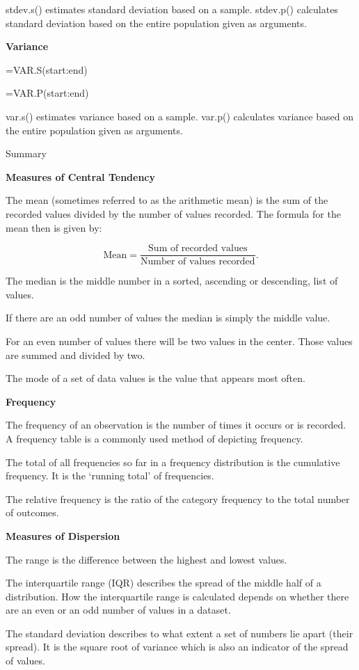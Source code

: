 \documentclass[
]{book}
\begin{document}
stdev.s() estimates standard deviation based on a sample. stdev.p() calculates standard deviation based on the entire population given as arguments.

\textbf{Variance}

=VAR.S(start:end)

=VAR.P(start:end)

var.s() estimates variance based on a sample. var.p() calculates variance based on the entire population given as arguments.

Summary

\textbf{Measures of Central Tendency}

The mean (sometimes referred to as the arithmetic mean) is the sum of the recorded values divided by the number of values recorded. The formula for the mean then is given by:

\[ \textrm{Mean} = \frac{\textrm{Sum of recorded values}}{\textrm{Number of values recorded}}.\]

The median is the middle number in a sorted, ascending or descending, list of values.

If there are an odd number of values the median is simply the middle value.

For an even number of values there will be two values in the center. Those values are summed and divided by two.

The mode of a set of data values is the value that appears most often.

\textbf{Frequency}

The frequency of an observation is the number of times it occurs or is recorded. A frequency table is a commonly used method of depicting frequency.

The total of all frequencies so far in a frequency distribution is the cumulative frequency. It is the `running total' of frequencies.

The relative frequency is the ratio of the category frequency to the total number of outcomes.

\textbf{Measures of Dispersion}

The range is the difference between the highest and lowest values.

The interquartile range (IQR) describes the spread of the middle half of a distribution. How the interquartile range is calculated depends on whether there are an even or an odd number of values in a dataset.

The standard deviation describes to what extent a set of numbers lie apart (their spread). It is the square root of variance which is also an indicator of the spread of values.
\end{document}
